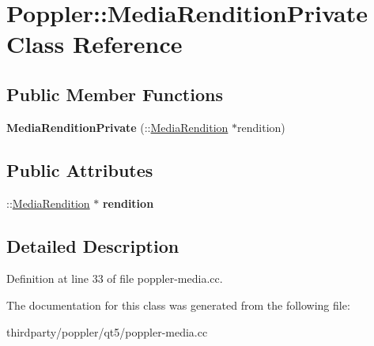 \hypertarget{class_poppler_1_1_media_rendition_private}{}\section{Poppler\+:\+:Media\+Rendition\+Private Class Reference}
\label{class_poppler_1_1_media_rendition_private}
\subsection*{Public Member Functions}
\begin{DoxyCompactItemize}
\item 
\mbox{\label{class_poppler_1_1_media_rendition_private_a32248a5c5d74666aab9a51500c2a8594}} 
{\bfseries Media\+Rendition\+Private} (\+::\hyperlink{class_poppler_1_1_media_rendition}{Media\+Rendition} $\ast$rendition)
\end{DoxyCompactItemize}
\subsection*{Public Attributes}
\begin{DoxyCompactItemize}
\item 
\mbox{\label{class_poppler_1_1_media_rendition_private_a8cd97c96d7b2e0c4fcf77fa156d37732}} 
\+::\hyperlink{class_poppler_1_1_media_rendition}{Media\+Rendition} $\ast$ {\bfseries rendition}
\end{DoxyCompactItemize}


\subsection{Detailed Description}


Definition at line 33 of file poppler-\/media.\+cc.



The documentation for this class was generated from the following file\+:\begin{DoxyCompactItemize}
\item 
thirdparty/poppler/qt5/poppler-\/media.\+cc\end{DoxyCompactItemize}

